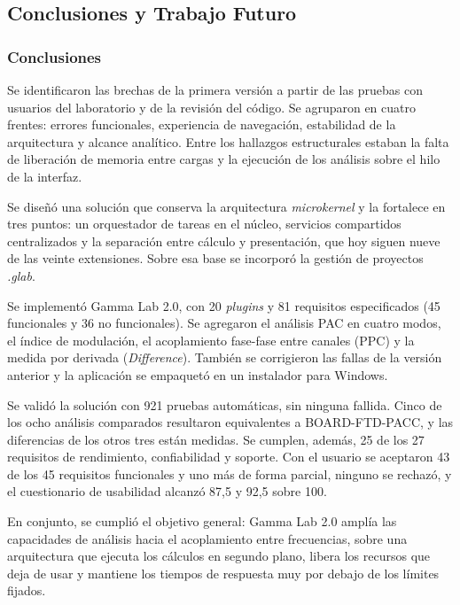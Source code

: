 \documentclass[12pt,letterpaper,oneside]{article}
\begin{document}
\subsection{Conclusiones y Trabajo Futuro}

\subsubsection{Conclusiones}

Se identificaron las brechas de la primera versión a partir de las pruebas con usuarios del laboratorio y de la revisión del código. Se agruparon en cuatro frentes: errores funcionales, experiencia de navegación, estabilidad de la arquitectura y alcance analítico. Entre los hallazgos estructurales estaban la falta de liberación de memoria entre cargas y la ejecución de los análisis sobre el hilo de la interfaz.

Se diseñó una solución que conserva la arquitectura \textit{microkernel} y la fortalece en tres puntos: un orquestador de tareas en el núcleo, servicios compartidos centralizados y la separación entre cálculo y presentación, que hoy siguen nueve de las veinte extensiones. Sobre esa base se incorporó la gestión de proyectos \textit{.glab}.

Se implementó Gamma Lab 2.0, con 20 \textit{plugins} y 81 requisitos especificados (45 funcionales y 36 no funcionales). Se agregaron el análisis PAC en cuatro modos, el índice de modulación, el acoplamiento fase-fase entre canales (PPC) y la medida por derivada (\textit{Difference}). También se corrigieron las fallas de la versión anterior y la aplicación se empaquetó en un instalador para Windows.

Se validó la solución con 921 pruebas automáticas, sin ninguna fallida. Cinco de los ocho análisis comparados resultaron equivalentes a BOARD-FTD-PACC, y las diferencias de los otros tres están medidas. Se cumplen, además, 25 de los 27 requisitos de rendimiento, confiabilidad y soporte. Con el usuario se aceptaron 43 de los 45 requisitos funcionales y uno más de forma parcial, ninguno se rechazó, y el cuestionario de usabilidad alcanzó 87,5 y 92,5 sobre 100.

En conjunto, se cumplió el objetivo general: Gamma Lab 2.0 amplía las capacidades de análisis hacia el acoplamiento entre frecuencias, sobre una arquitectura que ejecuta los cálculos en segundo plano, libera los recursos que deja de usar y mantiene los tiempos de respuesta muy por debajo de los límites fijados.
\end{document}
